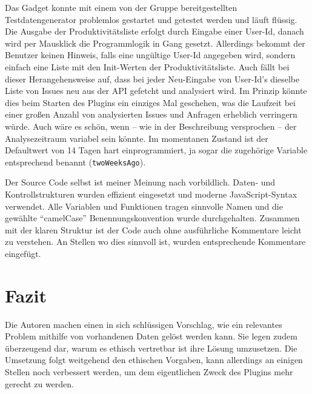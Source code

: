 \documentclass[oneside,12pt,a4paper,fleqn]{article}
\begin{document}
Das Gadget konnte mit einem von der Gruppe bereitgestellten Testdatengenerator problemlos gestartet und getestet werden und läuft flüssig. Die Ausgabe der Produktivitätsliste erfolgt durch Eingabe einer User-Id, danach wird per Mausklick die Programmlogik in Gang gesetzt. Allerdings bekommt der Benutzer keinen Hinweis, falls eine ungültige User-Id angegeben wird, sondern einfach eine Liste mit den Init-Werten der Produktivitätsliste. Auch fällt bei dieser Herangehensweise auf, dass bei jeder Neu-Eingabe von User-Id's dieselbe Liste von Issues neu aus der API gefetcht und analysiert wird. Im Prinzip könnte dies beim Starten des Plugins ein einziges Mal geschehen, was die Laufzeit bei einer großen Anzahl von analysierten Issues und Anfragen erheblich verringern würde. Auch wäre es schön, wenn -- wie in der Beschreibung versprochen -- der Analysezeitraum variabel sein könnte. Im momentanen Zustand ist der Defaultwert von 14 Tagen hart einprogrammiert, ja sogar die zugehörige Variable entsprechend benannt ({\tt twoWeeksAgo}).

\medskip

Der Source Code selbst ist meiner Meinung nach vorbildlich. Daten- und Kontrollstrukturen wurden effizient eingesetzt und moderne JavaScript-Syntax verwendet. Alle Variablen und Funktionen tragen sinnvolle Namen und die gewählte ``camelCase'' Benennungskonvention wurde durchgehalten. Zusammen mit der klaren Struktur ist der Code auch ohne ausführliche Kommentare leicht zu verstehen. An Stellen wo dies sinnvoll ist, wurden entsprechende Kommentare eingefügt.

\section{Fazit}

Die Autoren machen einen in sich schlüssigen Vorschlag, wie ein relevantes Problem mithilfe von vorhandenen Daten gelöst werden kann. Sie legen zudem überzeugend dar, warum es ethisch vertretbar ist ihre Lösung umzusetzen. Die Umsetzung folgt weitgehend den ethischen Vorgaben, kann allerdings an einigen Stellen noch verbessert werden, um dem eigentlichen Zweck des Plugins mehr gerecht zu werden.
\end{document}
